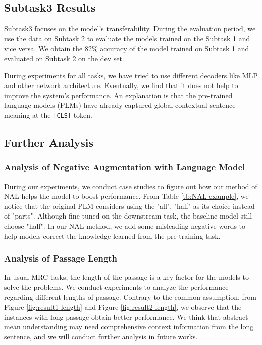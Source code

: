 \documentclass[11pt,a4paper]{article}
\begin{document}
\subsection{Subtask3 Results}
Subtask3 focuses on the model's transferability. 
During the evaluation period, we use the data on Subtask 2 to evaluate the models trained on the Subtask 1 and vice versa.
We obtain the 82\% accuracy of the model trained on Subtask 1 and evaluated on Subtask 2 on the dev set.

During experiments for all tasks, we have tried to use different decoders like MLP and other network architecture. Eventually, we find that it does not help to improve the system's performance. 
An explanation is that the pre-trained language models (PLMs) have already captured global contextual sentence meaning at the \texttt{[CLS]} token. 

\subsection{Further Analysis}
\label{sec:error-analysis}

\subsubsection{Analysis of Negative Augmentation with Language Model}
During our experiments, we conduct case studies to figure out how our method of NAL helps the model to boost performance.
From Table \ref{tb:NAL-example}, we notice that the original PLM considers using the "all", "half" as its choice instead of "parts".
Although fine-tuned on the downstream task, the baseline model still choose "half".
In our NAL method, we add some misleading negative words to help models correct the knowledge learned from the pre-training task.

\subsubsection{Analysis of Passage Length}
In usual MRC tasks, the length of the passage is a key factor for the models to solve the problems. We conduct experiments to analyze the performance regarding different lengths of passage. Contrary to the common assumption, from Figure \ref{fig:result1-length} and Figure \ref{fig:result2-length}, we observe that the instances with long passage obtain better performance. We think that abstract mean understanding may need comprehensive context information from the long sentence, and we will conduct further analysis in future works. 
\end{document}
